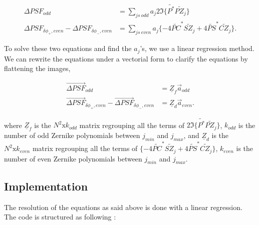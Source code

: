 \begin{align}
\Delta PSF_{odd} &= \sum\limits_{js\ odd} a_j 2\Im\lbrace \widetilde{P^*}\widetilde{P Z_j}\rbrace \label{eqt:DeltaPSFoddonZernike}\\
\Delta PSF_{\delta\phi_+, even}-\Delta PSF_{\delta\phi_-, even} &= \sum\limits_{js\ even} a_j \lbrace-4\widetilde{PC}^*\widetilde{SZ_j} +4\widetilde{PS}^*\widetilde{CZ_j}\rbrace.\label{eqt:DeltaPSF+-DeltaPSF-evenonZernike}
\end{align}

To solve these two equations and find the $a_j$'s, we use a linear regression method. We can rewrite the equations under a vectorial form to clarify the equations by flattening the images,

\begin{align}
\overrightarrow{\Delta PSF}_{odd} &= \underline{Z}_f\vec{a}_{odd}  \label{eqt:DeltaPSFoddonZernikeMAtrix}\\
\overrightarrow{\Delta PSF}_{\delta\phi_+, even}-\overrightarrow{\Delta PSF}_{\delta\phi_-, even} &= \underline{Z}_d \vec{a}_{even}.\label{eqt:DeltaPSF+-DeltaPSF-evenonZernikeMatrix}
\end{align}

where $\underline{Z}_f$ is the $N^2 \mathrm{x} k_{odd}$ matrix regrouping all the terms of $2\Im\lbrace \widetilde{P^*}\widetilde{P Z_j}\rbrace$, $k_{odd}$ is the number of odd Zernike polynomials between $j_{min}$ and $j_{max}$, and $\underline{Z}_d$ is the $N^2 \mathrm{x} k_{even}$ matrix regrouping all the terms of $\lbrace-4\widetilde{PC}^*\widetilde{SZ_j} +4\widetilde{PS}^*\widetilde{CZ_j}\rbrace$, $k_{even}$ is the number of even Zernike polynomials between $j_{min}$ and $j_{max}$.

\subsection{Implementation}

The resolution of the equations as said above is done with a linear regression. The code is structured as following :

